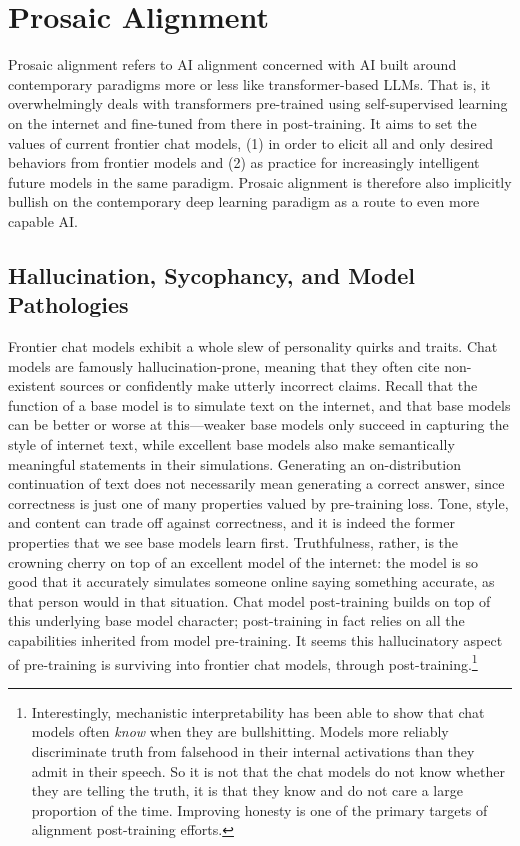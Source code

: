 \section{Prosaic Alignment}

Prosaic alignment refers to AI alignment concerned with AI built around
contemporary paradigms more or less like transformer-based LLMs. That is, it overwhelmingly
deals with transformers pre-trained using self-supervised learning on the
internet and fine-tuned from there in post-training. It aims to set the values
of current frontier chat models, (1) in order to elicit all and only desired
behaviors from frontier models and (2) as practice for increasingly intelligent
future models in the same paradigm. Prosaic alignment is therefore also
implicitly bullish on the contemporary deep learning paradigm as a route to
even more capable AI.

\subsection{Hallucination, Sycophancy, and Model Pathologies}
Frontier chat models exhibit a whole slew of personality quirks and traits.
Chat models are famously hallucination-prone, meaning that they often cite
non-existent sources or confidently make utterly incorrect claims. Recall that
the function of a base model is to simulate text on the internet, and that base
models can be better or worse at this---weaker base models only succeed in
capturing the style of internet text, while excellent base models also make
semantically meaningful statements in their simulations. Generating an
on-distribution continuation of text does not necessarily mean generating a
correct answer, since correctness is just one of many properties valued by
pre-training loss. Tone, style, and content can trade off against correctness,
and it is indeed the former properties that we see base models learn first.
Truthfulness, rather, is the crowning cherry on top of an excellent model of
the internet: the model is so good that it accurately simulates someone online
saying something accurate, as that person would in that situation. Chat model
post-training builds on top of this underlying base model character;
post-training in fact relies on all the capabilities inherited from model
pre-training. It seems this hallucinatory aspect of pre-training is surviving
into frontier chat models, through post-training.\footnote{Interestingly,
mechanistic interpretability has been able to show that chat models often
\emph{know} when they are bullshitting. Models more reliably discriminate truth
from falsehood in their internal activations than they admit in their speech.
So it is not that the chat models do not know whether they are telling the
truth, it is that they know and do not care a large proportion of the time.
Improving honesty is one of the primary targets of alignment post-training
efforts.}

